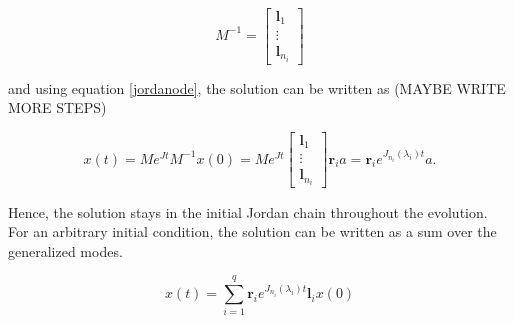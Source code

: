 \documentclass[../main.tex]{subfiles}
\begin{document}
\begin{equation}
    M^{-1} = \begin{bmatrix} \boldsymbol{l}_1 \\ \vdots \\ \boldsymbol{l}_{n_i} \end{bmatrix}
\end{equation}

and using equation \ref{jordanode}, the solution can be written as (MAYBE WRITE MORE STEPS)

\begin{equation}\label{genmode}
    x(t) = Me^{Jt}M^{-1}x(0) = Me^{Jt} \begin{bmatrix} \boldsymbol{l}_1 \\ \vdots \\ \boldsymbol{l}_{n_i} \end{bmatrix} \boldsymbol{r}_ia = \boldsymbol{r}_i e^{J_{n_i}(\lambda_i)t} a.
\end{equation}

Hence, the solution stays in the initial Jordan chain throughout the evolution. For an arbitrary initial condition, the solution can be written as a sum over the generalized modes. 

\begin{equation}
    x(t) = \sum_{i=1}^q \boldsymbol{r}_i e^{J_{n_i}(\lambda_i)t} \boldsymbol{l}_i x(0)
\end{equation}
\end{document}

